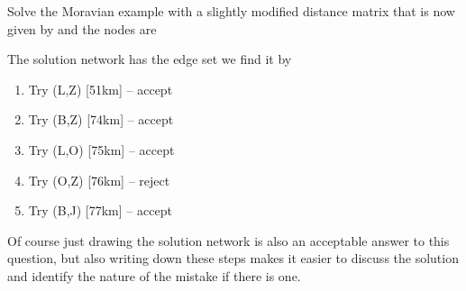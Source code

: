 



 Solve the Moravian example with a slightly modified distance matrix that is now given by
 and the nodes are 


\solution
The solution network has the edge set 
we find it by
\begin{enumerate}[label=\arabic*.]
    \item Try (L,Z) [51km] -- accept
    \item Try (B,Z) [74km] -- accept
    \item Try (L,O) [75km] -- accept
    \item Try (O,Z) [76km] -- reject
    \item Try (B,J) [77km] -- accept 
\end{enumerate}
Of course just drawing the solution network is also an acceptable answer to this question, but also writing down these steps makes it easier to discuss the solution and identify the nature of the mistake if there is one.  

